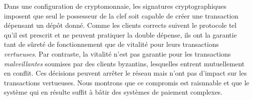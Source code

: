 \documentclass[letterpaper,twocolumn,10pt]{article}
\theoremstyle{definition}
\begin{document}
Dans une configuration de cryptomonnaie, les signatures cryptographiques imposent que seul le possesseur de la clef soit capable de créer une transaction dépensant un dépôt donné. Comme les clients corrects suivent le protocole tel qu'il est prescrit et ne peuvent pratiquer la double dépense, ils ont la garantie tant de sûreté de fonctionnement que de vitalité pour leurs transactions \emph{vertueuses}. Par contraste, la vitalité n'est pas garantie pour les transactions \emph{malveillantes} soumises par des clients byzantins, lesquelles entrent mutuellement en conflit. Ces décisions peuvent arrêter le réseau mais n'ont pas d'impact sur les transactions vertueuses.
Nous montrons que ce compromis est raisnnable et que le système qui en résulte suffit à bâtir des systèmes de paiement complexes.



\end{document}
